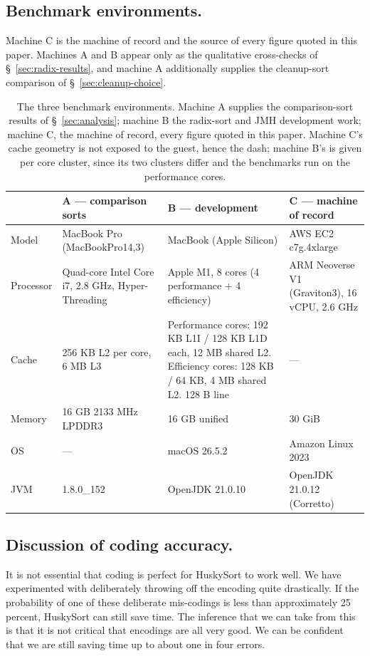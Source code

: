 \documentclass[twoside,leqno,twocolumn]{article}
\begin{document}
\subsection{Benchmark environments.}
\label{sec:environments}

Machine C is the machine of record and the source of every figure quoted in this paper.
Machines A and B appear only as the qualitative cross-checks of \S~\ref{sec:radix-results}, and
machine A additionally supplies the cleanup-sort comparison of \S~\ref{sec:cleanup-choice}.

\begin{table}
  \caption{The three benchmark environments. Machine A supplies the comparison-sort results of
    \S~\ref{sec:analysis}; machine B the radix-sort and JMH development work; machine C, the machine
    of record, every figure quoted in this paper. Machine C's cache geometry is not exposed to the
    guest, hence the dash; machine B's is given per core cluster, since its two clusters differ and
    the benchmarks run on the performance cores.}
  \label{tab:SysEnv}
  \begin{tabularx}{\linewidth}{lXXX}
    \toprule
    & \textbf{A} --- comparison sorts & \textbf{B} --- development & \textbf{C} --- machine of record \\
    \midrule
    Model & MacBook Pro (MacBookPro14,3) & MacBook (Apple Silicon) & AWS EC2 c7g.4xlarge \\
    Processor & Quad-core Intel Core i7, 2.8 GHz, Hyper-Threading & Apple M1, 8 cores (4 performance + 4 efficiency) & ARM Neoverse V1 (Graviton3), 16 vCPU, 2.6 GHz \\
    Cache & 256 KB L2 per core, 6 MB L3 & Performance cores: 192 KB L1I / 128 KB L1D each, 12 MB shared L2. Efficiency cores: 128 KB / 64 KB, 4 MB shared L2. 128 B line & --- \\
    Memory & 16 GB 2133 MHz LPDDR3 & 16 GB unified & 30 GiB \\
    OS & --- & macOS 26.5.2 & Amazon Linux 2023 \\
    JVM & 1.8.0\_152 & OpenJDK 21.0.10 & OpenJDK 21.0.12 (Corretto) \\
    \bottomrule
  \end{tabularx}
\end{table}

\subsection{Discussion of coding accuracy.}
It is not essential that coding is perfect for HuskySort to work well.
We have experimented with deliberately throwing off the encoding quite drastically.
If the probability of one of these deliberate mis-codings is less than approximately 25 percent, HuskySort can still save time.
The inference that we can take from this is that it is not critical that encodings are all very good.
We can be confident that we are still saving time up to about one in four errors.
\end{document}
